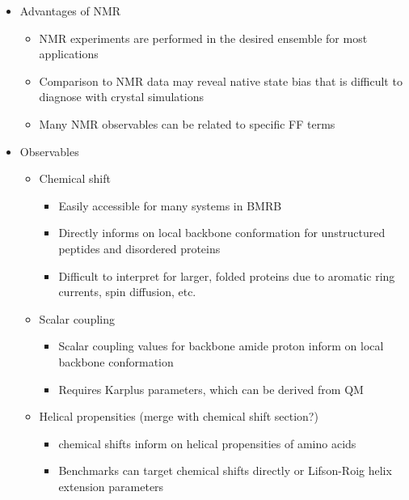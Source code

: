 \documentclass[9pt,review]{livecoms}
\begin{document}
\begin{itemize}

\item Advantages of NMR

	\begin{itemize}
	\item NMR experiments are performed in the desired ensemble for most applications
	\item Comparison to NMR data may reveal native state bias that is difficult to diagnose with crystal simulations
	\item Many NMR observables can be related to specific FF terms
	\end{itemize}

\item Observables

	\begin{itemize}

	\item Chemical shift

		\begin{itemize}
		\item Easily accessible for many systems in BMRB
		\item Directly informs on local backbone conformation for unstructured peptides and disordered proteins
		\item Difficult to interpret for larger, folded proteins due to aromatic ring currents, spin diffusion, etc.
		\end{itemize}

	\item Scalar coupling

		\begin{itemize}
		\item Scalar coupling values for backbone amide proton inform on local backbone conformation
		\item Requires Karplus parameters, which can be derived from QM
		\end{itemize}

	\item Helical propensities (merge with chemical shift section?)

		\begin{itemize}
		\item {} chemical shifts inform on helical propensities of amino acids
		\item Benchmarks can target chemical shifts directly or Lifson-Roig helix extension parameters
		\end{itemize}


\end{itemize}
\end{itemize}
\end{document}
